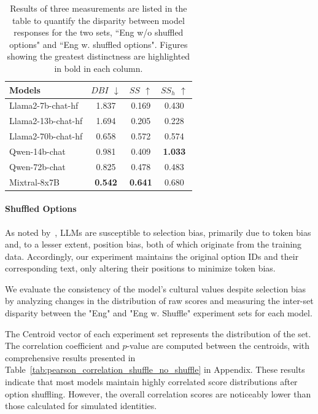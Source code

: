 \documentclass[11pt]{article}
\begin{document}
\begin{table}[!hbt]
\centering
\setlength\tabcolsep{4pt}
\renewcommand{\arraystretch}{1.2}
\begin{tabular}{l|c|c|c}
\hline
\textbf{Models} & { \textbf{$DBI$} $\downarrow$ } & {\textbf{$SS$} $\uparrow$ } & {\textbf{$SS_h$} $\uparrow$ } \\
\hline
{Llama2-7b-chat-hf} & 1.837 & 0.169 & 0.430 \\
{Llama2-13b-chat-hf} & 1.694 & 0.205 & 0.228 \\
{Llama2-70b-chat-hf} & 0.658 & 0.572 & 0.574 \\
{Qwen-14b-chat} & 0.981 & 0.409 & \textbf{1.033} \\
{Qwen-72b-chat} & 0.825 & 0.478 & 0.483 \\
{Mixtral-8x7B} & \textbf{0.542} & \textbf{0.641} & 0.680 \\

\hline
\end{tabular}
\caption{Results of three measurements are listed in the table to quantify the disparity between model responses for the two sets, ``Eng w/o shuffled options" and ``Eng w. shuffled options". Figures showing the greatest distinctness are highlighted in bold in each column. }
\label{tab:distance_between_shuffle_no_shuffle}

\end{table}

\paragraph{Shuffled Options} As noted by~\citet{zheng2024large}, LLMs are susceptible to selection bias, primarily due to token bias and, to a lesser extent, position bias, both of which originate from the training data. Accordingly, our experiment maintains the original option IDs and their corresponding text, only altering their positions to minimize token bias.

We evaluate the consistency of the model's cultural values despite selection bias by analyzing changes in the distribution of raw scores and measuring the inter-set disparity between the "Eng" and "Eng w. Shuffle" experiment sets for each model.

The Centroid vector of each experiment set represents the distribution of the set. The correlation coefficient and $p$-value are computed between the centroids, with comprehensive results presented in Table~\ref{tab:pearson_correlation_shuffle_no_shuffle} in Appendix. These results indicate that most models maintain highly correlated score distributions after option shuffling. However, the overall correlation scores are noticeably lower than those calculated for simulated identities.
\end{document}
